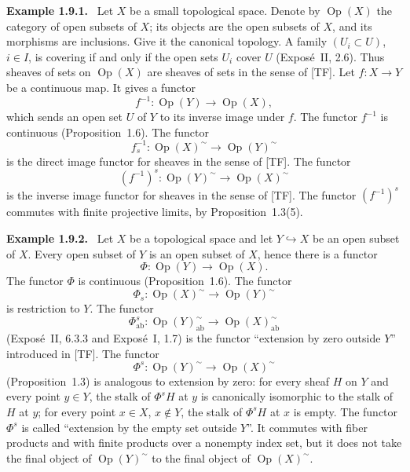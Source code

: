 \documentclass[11pt]{article}
\newenvironment{remarktext}[1]{\par\medskip\noindent\textbf{#1.}\ }{\par\medskip}
\begin{document}
\begin{remarktext}{Example 1.9.1}
Let \(X\) be a small topological space. Denote by \(\operatorname{Op}(X)\) the category of open subsets of \(X\); its objects are the open subsets of \(X\), and its morphisms are inclusions. Give it the canonical topology. A family \((U_i\subset U)\), \(i\in I\), is covering if and only if the open sets \(U_i\) cover \(U\) (Expos\'e~II, 2.6). Thus sheaves of sets on \(\operatorname{Op}(X)\) are sheaves of sets in the sense of [TF]. Let \(f:X\to Y\) be a continuous map. It gives a functor
\[
f^{-1}:\operatorname{Op}(Y)\longrightarrow\operatorname{Op}(X),
\]
which sends an open set \(U\) of \(Y\) to its inverse image under \(f\). The functor \(f^{-1}\) is continuous (Proposition~1.6). The functor
\[
f^{-1}_s:\operatorname{Op}(X)^{\sim}\longrightarrow \operatorname{Op}(Y)^{\sim}
\]
is the direct image functor for sheaves in the sense of [TF]. The functor
\[
(f^{-1})^s:\operatorname{Op}(Y)^{\sim}\longrightarrow \operatorname{Op}(X)^{\sim}
\]
is the inverse image functor for sheaves in the sense of [TF]. The functor \((f^{-1})^s\) commutes with finite projective limits, by Proposition~1.3(5).
\end{remarktext}

\begin{remarktext}{Example 1.9.2}
Let \(X\) be a topological space and let \(Y\hookrightarrow X\) be an open subset of \(X\). Every open subset of \(Y\) is an open subset of \(X\), hence there is a functor
\[
\Phi:\operatorname{Op}(Y)\longrightarrow \operatorname{Op}(X).
\]
The functor \(\Phi\) is continuous (Proposition~1.6). The functor
\[
\Phi_s:\operatorname{Op}(X)^{\sim}\longrightarrow \operatorname{Op}(Y)^{\sim}
\]
is restriction to \(Y\). The functor
\[
\Phi^s_{\mathrm{ab}}:\operatorname{Op}(Y)^{\sim}_{\mathrm{ab}}
\longrightarrow \operatorname{Op}(X)^{\sim}_{\mathrm{ab}}
\]
(Expos\'e~II, 6.3.3 and Expos\'e~I, 1.7) is the functor ``extension by zero outside \(Y\)'' introduced in [TF]. The functor
\[
\Phi^s:\operatorname{Op}(Y)^{\sim}\longrightarrow \operatorname{Op}(X)^{\sim}
\]
(Proposition~1.3) is analogous to extension by zero: for every sheaf \(H\) on \(Y\) and every point \(y\in Y\), the stalk of \(\Phi^sH\) at \(y\) is canonically isomorphic to the stalk of \(H\) at \(y\); for every point \(x\in X\), \(x\notin Y\), the stalk of \(\Phi^sH\) at \(x\) is empty. The functor \(\Phi^s\) is called ``extension by the empty set outside \(Y\)''. It commutes with fiber products and with finite products over a nonempty index set, but it does not take the final object of \(\operatorname{Op}(Y)^{\sim}\) to the final object of \(\operatorname{Op}(X)^{\sim}\).
\end{remarktext}
\end{document}
